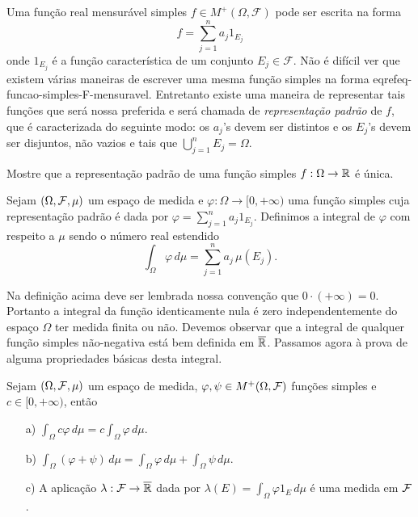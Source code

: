 Uma função real  mensurável simples 
$f\in M^{+}(\Omega,\mathcal{F})$ 
pode ser escrita na forma 
\begin{equation}\label{eq-funcao-simples-F-mensuravel}
f=\sum_{j=1}^{n}a_j 1_{E_j}
\end{equation}
onde $1_{E_j}$ é a função característica de um conjunto $E_j\in \mathcal{F}$. 
Não é difícil ver que existem várias maneiras de 
escrever uma mesma função simples na 
forma eqref{eq-funcao-simples-F-mensuravel}. 
Entretanto existe uma maneira de
representar tais funções que será nossa preferida 
e será chamada de
\emph{representação padrão}
 de $f$, 
que é caracterizada do seguinte modo: 
os $a_j$'s devem ser distintos e os $E_j$'s devem ser disjuntos, 
não vazios e tais que $\bigcup_{j=1}^nE_j=\Omega$. 
%
%
\begin{exercicio}
Mostre que a representação padrão de uma função 
simples $f:\Omega\to\mathbb{R}$ é única.
\end{exercicio}
%
%
%
%
\begin{definicao}
\label{def-integral-funcao-simples-positiva}
Sejam $(\Omega,\mathcal{F},\mu)$ um espaço de medida e 
$\varphi:\Omega\to [0,+\infty)$ uma função simples cuja representação 
padrão é dada por $\varphi = \sum_{j=1}^n a_j1_{E_j}$.
Definimos a integral de $\varphi$ com respeito a $\mu$ 
sendo o número real estendido 
	\[
		\int_{\Omega} \varphi \, d\mu 
		=
		\sum_{j=1}^n a_j\, \mu(E_j).
	\]
\end{definicao}

Na definição acima deve ser lembrada nossa convenção 
que $0\cdot(+\infty)=0$. Portanto a integral da 
função identicamente nula é zero independentemente do 
espaço $\Omega$ ter medida finita ou não. 
Devemos observar que a integral de qualquer função 
simples não-negativa está bem definida em $\overline{\mathbb{R}}$.
Passamos agora à prova de alguma propriedades 
básicas desta integral.








\begin{lema}
Sejam $(\Omega,\mathcal{F},\mu)$ um espaço de medida, 
$\varphi,\psi \in M^+(\Omega,\mathcal{F})$ 
funções simples e $c\in [0,+\infty)$,
então
\begin{itemize}
	\item[a)]
	\(\displaystyle 
		\int_{\Omega} c\varphi\, d\mu
		=
		c\int_{\Omega} \varphi \, d\mu.
	\)
	

	\item[b)]
	\(\displaystyle 
		\int_{\Omega} (\varphi+\psi)\, d\mu
		=
		\int_{\Omega} \varphi \, d\mu
		+
		\int_{\Omega} \psi \, d\mu.
	\)
	
	\item[c)] A aplicação $\lambda:\mathcal{F}\to\overline{\mathbb{R}}$
	dada por 
		\(\displaystyle
			\lambda(E) = \int_{\Omega} \varphi 1_{E}\, d\mu
		\)
	é uma medida em $\mathcal{F}$.
\end{itemize}
\end{lema}



